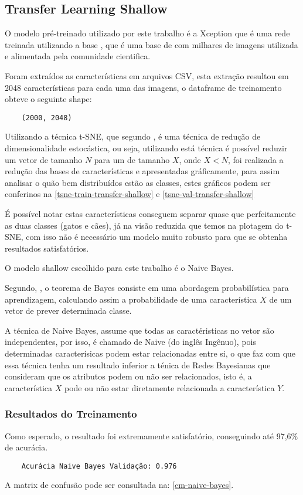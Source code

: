 \subsection{Transfer Learning Shallow}

O modelo pré-treinado utilizado por este trabalho é a Xception que é uma rede treinada utilizando a base , que é uma base de com milhares de imagens utilizada e alimentada pela comunidade cientifica.

Foram extraídos as características em arquivos CSV, esta extração resultou em 2048 características para cada uma das imagens, o dataframe de treinamento obteve o seguinte shape:

\begin{verbatim}
	(2000, 2048)
\end{verbatim}

Utilizando a técnica t-SNE, que segundo , é uma técnica de redução de dimensionalidade estocástica, ou seja, utilizando está técnica é possível reduzir um vetor de tamanho \(N\) para um de tamanho \(X\), onde \(X < N\), foi realizada a redução das bases de características e apresentadas gráficamente, para assim analisar o quão bem distribuídos estão as classes, estes gráficos podem ser conferinos na \autoref{tsne-train-transfer-shallow} e \autoref{tsne-val-transfer-shallow}

É possível notar estas características conseguem separar quase que perfeitamente as duas classes (gatos e cães), já na visão reduzida que temos na plotagem do t-SNE, com isso não é necessário um modelo muito robusto para que se obtenha resultados satisfatórios. 

O modelo shallow escolhido para este trabalho é o Naive Bayes.

Segundo, , o teorema de Bayes consiste em uma abordagem probabilística para aprendizagem, calculando assim a probabilidade de uma característica \(X\) de um vetor de prever determinada classe.

A técnica de Naive Bayes, assume que todas as caractéristicas no vetor são independentes, por isso, é chamado de Naive (do inglês Ingênuo), pois determinadas caracterísicas podem estar relacionadas entre si, o que faz com que essa técnica tenha um resultado inferior a ténica de Redes Bayesianas que consideram que os atributos podem ou não ser relacionados, isto é, a característica \(X\) pode ou não estar diretamente relacionada a característica \(Y\).

\subsubsection{Resultados do Treinamento}

Como esperado, o resultado foi extremamente satisfatório, conseguindo até 97,6\% de acurácia.


\begin{verbatim}
	Acurácia Naive Bayes Validação: 0.976
\end{verbatim}

A matrix de confusão pode ser consultada na: \autoref{cm-naive-bayes}.